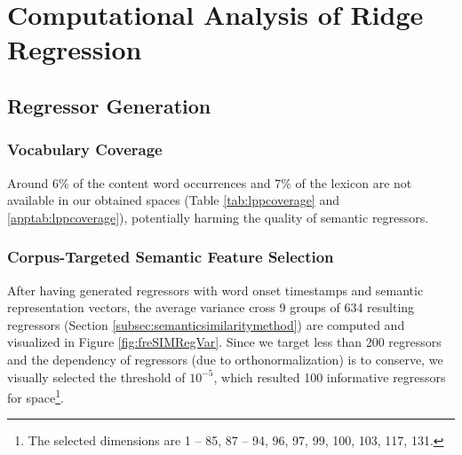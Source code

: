 \section{Computational Analysis of Ridge Regression}

\subsection{Regressor Generation}

\subsubsection{Vocabulary Coverage}
Around 6\% of the content word occurrences and 7\% of the lexicon are not available in our obtained spaces (Table \ref{tab:lppcoverage} and \ref{apptab:lppcoverage}), potentially harming the quality of semantic regressors. 



\subsubsection{Corpus-Targeted Semantic Feature Selection}

After having generated regressors with word onset timestamps and semantic representation vectors, the average variance cross 9 groups of 634 resulting regressors (Section \ref{subsec:semanticsimilaritymethod}) are computed and visualized in Figure \ref{fig:freSIMRegVar}. Since we target less than 200 regressors and the dependency of regressors (due to orthonormalization) is to conserve, we visually selected the threshold of \(10^{-5}\), which resulted 100 informative regressors for  space\footnote{The selected dimensions are 1 -- 85, 87 -- 94, 96, 97, 99, 100, 103, 117, 131.}.

